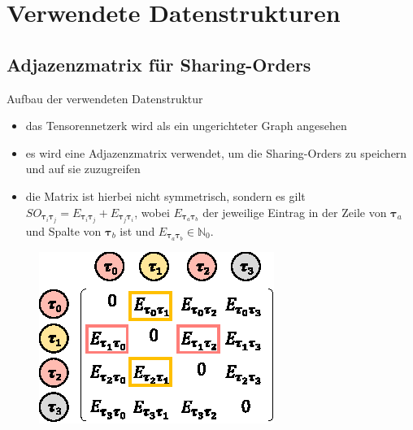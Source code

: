 \documentclass{beamer}
\newcommand{\tauB}{\bm{\tau}}
\begin{document}
\section{Verwendete Datenstrukturen}
\subsection{Adjazenzmatrix für Sharing-Orders}

\begin{frame}{Aufbau der verwendeten Datenstruktur}
	\begin{itemize}
		\item das Tensorennetzerk wird als ein ungerichteter Graph angesehen
		\item es wird eine Adjazenzmatrix verwendet, um die Sharing-Orders zu speichern und auf sie zuzugreifen
		\item die Matrix ist hierbei nicht symmetrisch,
		      sondern es gilt $SO_{\tauB_i \tauB_j} = E_{\tauB_i \tauB_j} + E_{\tauB_j \tauB_i}$, wobei $E_{\tauB_a \tauB_b}$ der jeweilige Eintrag in der Zeile von $\tauB_a$ und Spalte von $\tauB_b$ ist und $E_{\tauB_a \tauB_b} \in \mathbb{N}_0$.
	\end{itemize}
	\begin{figure}
		\includegraphics{figure_05_a}
	\end{figure}
\end{frame}
\end{document}
